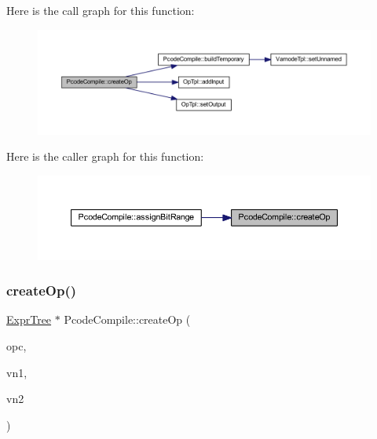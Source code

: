 Here is the call graph for this function\+:
\nopagebreak
\begin{figure}[H]
\begin{center}
\leavevmode
\includegraphics[width=350pt]{class_pcode_compile_ac653b660ec1b9cf01d6f8e84f916db99_cgraph}
\end{center}
\end{figure}
Here is the caller graph for this function\+:
\nopagebreak
\begin{figure}[H]
\begin{center}
\leavevmode
\includegraphics[width=350pt]{class_pcode_compile_ac653b660ec1b9cf01d6f8e84f916db99_icgraph}
\end{center}
\end{figure}
\mbox{\label{class_pcode_compile_a7631ae95d4326f458cfea9825bd2f1af}} 
\subsubsection{\texorpdfstring{createOp()}{createOp()}\hspace{0.1cm}{\footnotesize\ttfamily [2/2]}}
{\footnotesize\ttfamily \mbox{\hyperlink{class_expr_tree}{Expr\+Tree}} $\ast$ Pcode\+Compile\+::create\+Op (\begin{DoxyParamCaption}\item[{\mbox{\hyperlink{opcodes_8hh_abeb7dfb0e9e2b3114e240a405d046ea7}{Op\+Code}}}]{opc,  }\item[{\mbox{\hyperlink{class_expr_tree}{Expr\+Tree}} $\ast$}]{vn1,  }\item[{\mbox{\hyperlink{class_expr_tree}{Expr\+Tree}} $\ast$}]{vn2 }\end{DoxyParamCaption})}



